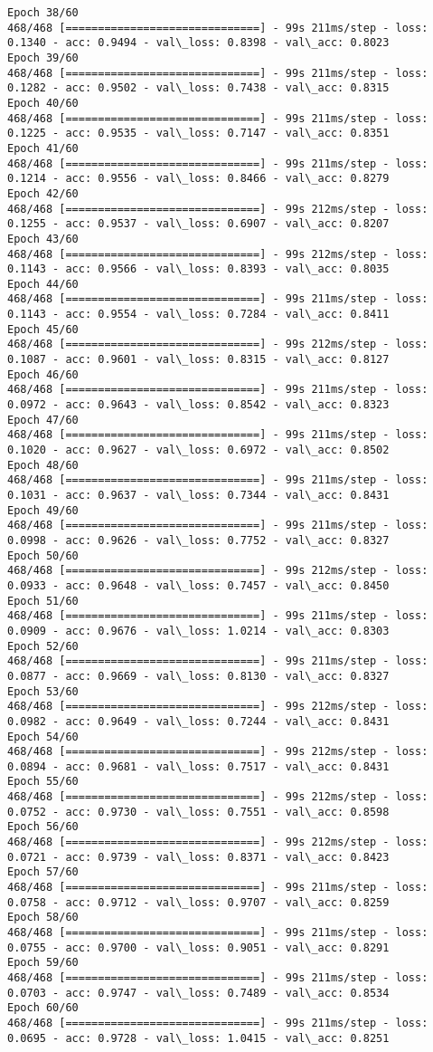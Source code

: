 \documentclass[11pt]{article}
\begin{document}
\begin{Verbatim}[commandchars=\\\{\}]
Epoch 38/60
468/468 [==============================] - 99s 211ms/step - loss: 0.1340 - acc: 0.9494 - val\_loss: 0.8398 - val\_acc: 0.8023
Epoch 39/60
468/468 [==============================] - 99s 211ms/step - loss: 0.1282 - acc: 0.9502 - val\_loss: 0.7438 - val\_acc: 0.8315
Epoch 40/60
468/468 [==============================] - 99s 211ms/step - loss: 0.1225 - acc: 0.9535 - val\_loss: 0.7147 - val\_acc: 0.8351
Epoch 41/60
468/468 [==============================] - 99s 211ms/step - loss: 0.1214 - acc: 0.9556 - val\_loss: 0.8466 - val\_acc: 0.8279
Epoch 42/60
468/468 [==============================] - 99s 212ms/step - loss: 0.1255 - acc: 0.9537 - val\_loss: 0.6907 - val\_acc: 0.8207
Epoch 43/60
468/468 [==============================] - 99s 212ms/step - loss: 0.1143 - acc: 0.9566 - val\_loss: 0.8393 - val\_acc: 0.8035
Epoch 44/60
468/468 [==============================] - 99s 211ms/step - loss: 0.1143 - acc: 0.9554 - val\_loss: 0.7284 - val\_acc: 0.8411
Epoch 45/60
468/468 [==============================] - 99s 212ms/step - loss: 0.1087 - acc: 0.9601 - val\_loss: 0.8315 - val\_acc: 0.8127
Epoch 46/60
468/468 [==============================] - 99s 211ms/step - loss: 0.0972 - acc: 0.9643 - val\_loss: 0.8542 - val\_acc: 0.8323
Epoch 47/60
468/468 [==============================] - 99s 211ms/step - loss: 0.1020 - acc: 0.9627 - val\_loss: 0.6972 - val\_acc: 0.8502
Epoch 48/60
468/468 [==============================] - 99s 211ms/step - loss: 0.1031 - acc: 0.9637 - val\_loss: 0.7344 - val\_acc: 0.8431
Epoch 49/60
468/468 [==============================] - 99s 211ms/step - loss: 0.0998 - acc: 0.9626 - val\_loss: 0.7752 - val\_acc: 0.8327
Epoch 50/60
468/468 [==============================] - 99s 212ms/step - loss: 0.0933 - acc: 0.9648 - val\_loss: 0.7457 - val\_acc: 0.8450
Epoch 51/60
468/468 [==============================] - 99s 211ms/step - loss: 0.0909 - acc: 0.9676 - val\_loss: 1.0214 - val\_acc: 0.8303
Epoch 52/60
468/468 [==============================] - 99s 211ms/step - loss: 0.0877 - acc: 0.9669 - val\_loss: 0.8130 - val\_acc: 0.8327
Epoch 53/60
468/468 [==============================] - 99s 212ms/step - loss: 0.0982 - acc: 0.9649 - val\_loss: 0.7244 - val\_acc: 0.8431
Epoch 54/60
468/468 [==============================] - 99s 212ms/step - loss: 0.0894 - acc: 0.9681 - val\_loss: 0.7517 - val\_acc: 0.8431
Epoch 55/60
468/468 [==============================] - 99s 212ms/step - loss: 0.0752 - acc: 0.9730 - val\_loss: 0.7551 - val\_acc: 0.8598
Epoch 56/60
468/468 [==============================] - 99s 212ms/step - loss: 0.0721 - acc: 0.9739 - val\_loss: 0.8371 - val\_acc: 0.8423
Epoch 57/60
468/468 [==============================] - 99s 211ms/step - loss: 0.0758 - acc: 0.9712 - val\_loss: 0.9707 - val\_acc: 0.8259
Epoch 58/60
468/468 [==============================] - 99s 211ms/step - loss: 0.0755 - acc: 0.9700 - val\_loss: 0.9051 - val\_acc: 0.8291
Epoch 59/60
468/468 [==============================] - 99s 211ms/step - loss: 0.0703 - acc: 0.9747 - val\_loss: 0.7489 - val\_acc: 0.8534
Epoch 60/60
468/468 [==============================] - 99s 211ms/step - loss: 0.0695 - acc: 0.9728 - val\_loss: 1.0415 - val\_acc: 0.8251

    \end{Verbatim}
\end{document}
